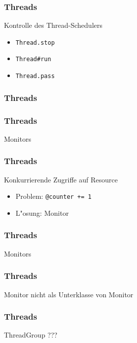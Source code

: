 \begin{frame}
  \frametitle{Threads}
  Kontrolle des Thread-Schedulers
  \begin{itemize}
    \item \texttt{Thread.stop} 
    \item \texttt{Thread\#run}
    \item \texttt{Thread.pass}
  \end{itemize}
\end{frame}

\begin{frame}
  \frametitle{Threads}
  
\end{frame}

\begin{frame}
  \frametitle{Threads}
  Monitors
  
\end{frame}

\begin{frame}
  \frametitle{Threads}
  Konkurrierende Zugriffe auf Resource
  \begin{itemize}
    \item Problem: \texttt{@counter += 1}\\
    \pause
    \item L"osung: Monitor
  \end{itemize}
\end{frame}

\begin{frame}
  \frametitle{Threads}
  Monitors
  
\end{frame}

\begin{frame}
  \frametitle{Threads}
  Monitor nicht als Unterklasse von Monitor
  
\end{frame}

\begin{frame}
  \frametitle{Threads}
  ThreadGroup ???
\end{frame}

